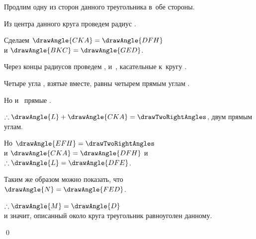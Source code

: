 \documentclass[letters,booklanguage=russian]{byrnebook}
\begin{document}
\begin{center}
Продлим одну из сторон  данного треугольника в~обе стороны.

Из центра данного круга проведем радиус .

Сделаем $\drawAngle{CKA} = \drawAngle{DFH}$ \\
и $\drawAngle{BKC} = \drawAngle{GED}$.

Через концы радиусов проведем ,  и~, касательные к~кругу .

Четыре угла
,
взятые вместе, равны четырем прямым углам .

Но  и~ прямые \byref{\constref}.

$\therefore \drawAngle{L} + \drawAngle{CKA} = \drawTwoRightAngles$, двум прямым углам.

Но $\drawAngle{EFH} = \drawTwoRightAngles$ \\
и $\drawAngle{CKA} = \drawAngle{DFH}$ \byref{\constref} и~$\therefore \drawAngle{L} = \drawAngle{DFE}$.

Таким же образом можно показать, что\\
$\drawAngle{N} = \drawAngle{FED}$.

$\therefore \drawAngle{M} = \drawAngle{D}$ \\
и значит, описанный около круга треугольник равноуголен данному.
\end{center}

\qed
\end{document}
